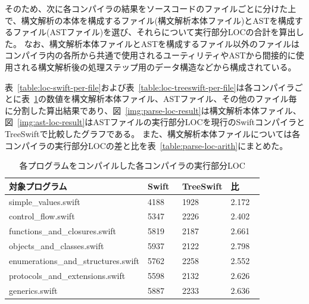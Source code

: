 そのため、次に各コンパイラの結果をソースコードのファイルごとに分けた上で、構文解析の本体を構成するファイル(構文解析本体ファイル)とASTを構成するファイル(ASTファイル)を選び、それらについて実行部分LOCの合計を算出した。
なお、構文解析本体ファイルとASTを構成するファイル以外のファイルはコンパイラ内の各所から共通で使用されるユーティリティやASTから間接的に使用される構文解析後の処理ステップ用のデータ構造などから構成されている。

表~\ref{table:loc-swift-per-file}および表~\ref{table:loc-treeswift-per-file}は各コンパイラごとに表~\ref{table:loc-result}の数値を構文解析本体ファイル、ASTファイル、その他のファイル毎に分割した算出結果であり、図~\ref{img:parse-loc-result}は構文解析本体ファイル、図~\ref{img:ast-loc-result}はASTファイルの実行部分LOCを現行のSwiftコンパイラとTreeSwiftで比較したグラフである。
また、構文解析本体ファイルについては各コンパイラの実行部分LOCの差と比を表~\ref{table:parse-loc-arith}にまとめた。

\begin{table}[!hbtp]
    \begin{center}
        \caption{各プログラムをコンパイルした各コンパイラの実行部分LOC}
        \begin{tabular}{|p{0.4\linewidth}|p{0.15\linewidth}|p{0.15\linewidth}|p{0.15\linewidth}|}
            \hline
            対象プログラム & Swift & TreeSwift & 比\\
            \hline
            \hline
            simple\_values.swift & 4188 & 1928 & 2.172\\
            \hline
            control\_flow.swift & 5347 & 2226 & 2.402\\
            \hline
            functions\_and\_closures.swift & 5819 & 2187 & 2.661\\
            \hline
            objects\_and\_classes.swift & 5937 & 2122 & 2.798\\
            \hline
            enumerations\_and\_structures.swift & 5762 & 2258 & 2.552\\
            \hline
            protocols\_and\_extensions.swift & 5598 & 2132 & 2.626\\
            \hline
            generics.swift & 5887 & 2233 & 2.636\\
            \hline
        \end{tabular}
        \label{table:loc-result}
    \end{center}
\end{table}

